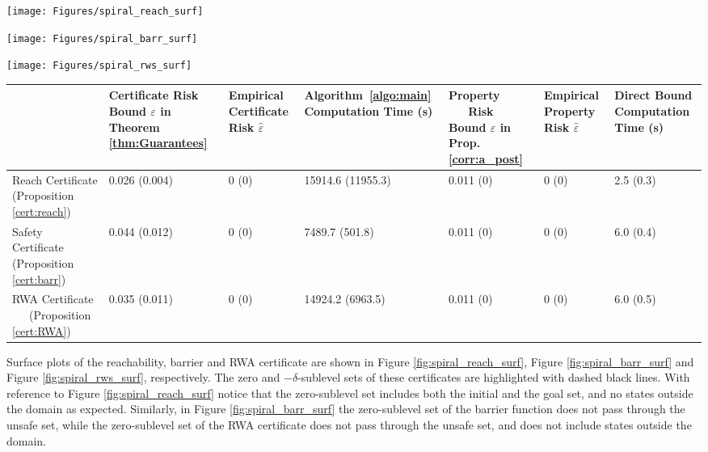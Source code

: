 \begin{figure*}[ht]
\centering
	\begin{minipage}{0.3\linewidth}
    \centering
		\texttt{[image: Figures/spiral\_reach\_surf]}
        \caption{Surface plot of the reachability certificate}
        \label{fig:spiral_reach_surf}
	\end{minipage}\hfill
	\begin{minipage}{0.3\linewidth}
    \centering
		\texttt{[image: Figures/spiral\_barr\_surf]}
        \caption{Surface plot of the safety/barrier certificate.}
        \label{fig:spiral_barr_surf}
	\end{minipage}\hfill
	\begin{minipage}{0.3\linewidth}
		\texttt{[image: Figures/spiral\_rws\_surf]}
        \caption{Surface plot of the RWA certificate.}
        \label{fig:spiral_rws_surf}
	\end{minipage}\hfill
\end{figure*}

\begin{table*}[t]
\begin{center}
    	\caption{Probabilistic guarantees for the system in \eqref{eq:spiral_dyn}. Standard deviations are shown in parentheses alongside means.}
	\begin{tabular}{p{2.5cm} || p{2cm} | p{2cm}| p{2cm} | p{2cm}| p{2cm}| p{2cm} }
		& Certificate Risk Bound $\varepsilon$ in Theorem \ref{thm:Guarantees} & Empirical Certificate Risk $\hat{\varepsilon}$&  Algorithm~\ref{algo:main} Computation Time (s)  & Property ~~~Risk Bound $\varepsilon$ in Prop. \ref{corr:a_post} & Empirical Property Risk $\hat{\varepsilon}$ & Direct Bound Computation Time (s) \\ \hline \hline
		Reach Certificate (Proposition \ref{cert:reach}) & 0.026 (0.004) & 0 (0) & 15914.6 (11955.3)  & 0.011 (0) & 0 (0) & 2.5 (0.3)  \\ \hline
		Safety Certificate (Proposition \ref{cert:barr}) & 0.044 (0.012) & 0 (0) & 7489.7 (501.8) & 0.011 (0)& 0 (0) & 6.0 (0.4) \\ \hline
		RWA Certificate ~~~(Proposition \ref{cert:RWA}) & 0.035 (0.011) & 0 (0) &  14924.2 (6963.5) & 0.011 (0) & 0 (0) & 6.0 (0.5)  \\ \hline 
	\end{tabular} \label{tab:guarantees}
\end{center}
\end{table*}

Surface plots of the reachability, barrier and RWA certificate are shown in Figure \ref{fig:spiral_reach_surf}, Figure \ref{fig:spiral_barr_surf} and Figure \ref{fig:spiral_rws_surf}, respectively. The zero and $-\delta$-sublevel sets of these certificates are highlighted with dashed black lines. With reference to Figure \ref{fig:spiral_reach_surf} notice that the zero-sublevel set includes both the initial and the goal set, and no states outside the domain as expected. Similarly, in Figure \ref{fig:spiral_barr_surf} the zero-sublevel set of the barrier function does not pass through the unsafe set, while the zero-sublevel set of the RWA certificate does not pass through the unsafe set, and does not include states outside the domain.

